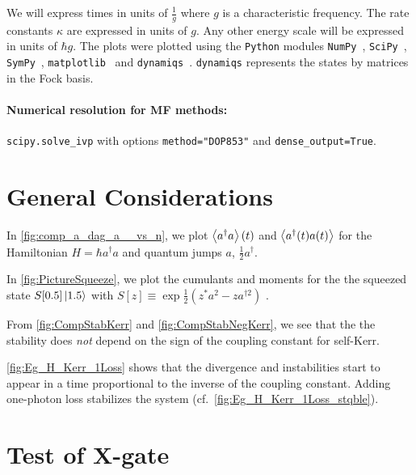 We will express times in units of $\frac{1}{g}$ where $g$ is a characteristic frequency. The rate constants $\kappa$ are expressed in units of $g$. Any other energy scale will be expressed in units of $\hbar g$. The plots were plotted using the \texttt{Python} modules \texttt{NumPy}~\cite{numpy}, \texttt{SciPy}~\cite{scipy}, \texttt{SymPy}~\cite{sympy}, \texttt{matplotlib}~\cite{matplotlib} and \texttt{dynamiqs}~\cite{dynamiqs}. \texttt{dynamiqs} represents the states by matrices in the Fock basis.

\paragraph{Numerical resolution for MF methods:} \texttt{scipy.solve\_ivp} with options \texttt{method="DOP853"} and \texttt{dense\_output=True}.
\section{General Considerations} \label{gene-other-plots}
In \autoref{fig:comp_a_dag_a__vs_n}, we plot $\left\langle a^\dagger a \right\rangle(t)$ and $\left\langle a^\dagger(t) a(t) \right\rangle$ for the Hamiltonian $H = \hbar a^\dagger a$ and quantum jumps $a$, $\frac{1}{2} a^\dagger$.

In \autoref{fig:PictureSqueeze}, we plot the cumulants and moments for the the squeezed state $S[0.5] \ket{1.5}$ with $S[z] \equiv \exp{\frac{1}{2}\left(z^* a^2 - z a^{\dagger 2}\right)}$ \cite{dynamiqs-squeeze}.

From \autoref{fig:CompStabKerr} and \autoref{fig:CompStabNegKerr}, we see that the the stability does \textit{not} depend on the sign of the coupling constant for self-Kerr.

\autoref{fig:Eg_H_Kerr_1Loss} shows that the divergence and instabilities start to appear in a time proportional to the inverse of the coupling constant. Adding one-photon loss stabilizes the system (cf.\@~\autoref{fig:Eg_H_Kerr_1Loss_stqble}).

\section{Test of X-gate} \label{x-gate-ab}

